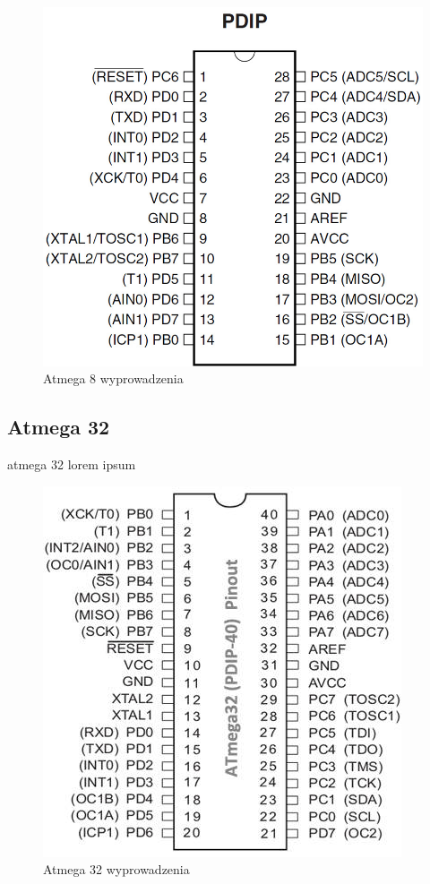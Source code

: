 \documentclass{article}
\begin{document}
\begin{figure}[H]
	\center
	\includegraphics[scale=0.3]{img/atmega8-pinout.jpg}
	\caption{Atmega 8 wyprowadzenia}
	\label{fig:img1}
\end{figure}

\subsection{Atmega 32}
atmega 32 lorem ipsum

\begin{figure}[H]
	\center
	\includegraphics[scale=0.5]{img/atmega32-pinout.jpg}
	\caption{Atmega 32 wyprowadzenia}
	\label{fig:img2}
\end{figure}
\end{document}
